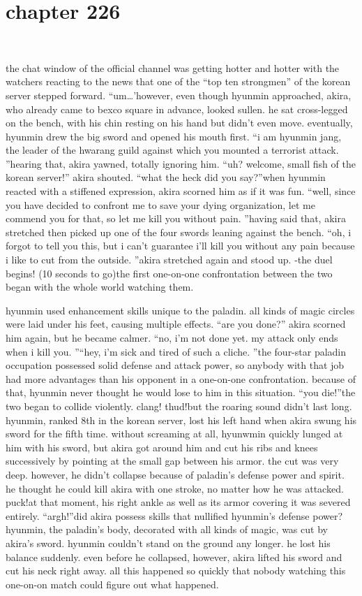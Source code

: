 \section{chapter 226}

                             




the chat window of the official channel was getting hotter and hotter with the watchers reacting to the news that one of the “top ten strongmen” of the korean server stepped forward.
“um…’however, even though hyunmin approached, akira, who already came to bexco square in advance, looked sullen.
 he sat cross-legged on the bench, with his chin resting on his hand but didn’t even move.
eventually, hyunmin drew the big sword and opened his mouth first.
“i am hyunmin jang, the leader of the hwarang guild against which you mounted a terrorist attack.
”hearing that, akira yawned, totally ignoring him.
“uh? welcome, small fish of the korean server!” akira shouted.
“what the heck did you say?”when hyunmin reacted with a stiffened expression, akira scorned him as if it was fun.
“well, since you have decided to confront me to save your dying organization, let me commend you for that, so let me kill you without pain.
”having said that, akira stretched then picked up one of the four swords leaning against the bench.
“oh, i forgot to tell you this, but i can’t guarantee i’ll kill you without any pain because i like to cut from the outside.
”akira stretched again and stood up.
-the duel begins! (10 seconds to go)the first one-on-one confrontation between the two began with the whole world watching them.

hyunmin used enhancement skills unique to the paladin.
 all kinds of magic circles were laid under his feet, causing multiple effects.
“are you done?” akira scorned him again, but he became calmer.
“no, i’m not done yet.
 my attack only ends when i kill you.
”“hey, i’m sick and tired of such a cliche.
”the four-star paladin occupation possessed solid defense and attack power, so anybody with that job had more advantages than his opponent in a one-on-one confrontation.
because of that, hyunmin never thought he would lose to him in this situation.
“you die!”the two began to collide violently.
clang! thud!but the roaring sound didn’t last long.
hyunmin, ranked 8th in the korean server, lost his left hand when akira swung his sword for the fifth time.
 without screaming at all, hyunwmin quickly lunged at him with his sword, but akira got around him and cut his ribs and knees successively by pointing at the small gap between his armor.
 the cut was very deep.
 however, he didn’t collapse because of paladin’s defense power and spirit.
 he thought he could kill akira with one stroke, no matter how he was attacked.
 puck!at that moment, his right ankle as well as its armor covering it was severed entirely.
“argh!”did akira possess skills that nullified hyunmin’s defense power? hyunmin, the paladin’s body, decorated with all kinds of magic, was cut by akira’s sword.
hyunmin couldn’t stand on the ground any longer.
 he lost his balance suddenly.
 even before he collapsed, however, akira lifted his sword and cut his neck right away.
all this happened so quickly that nobody watching this one-on-on match could figure out what happened.

